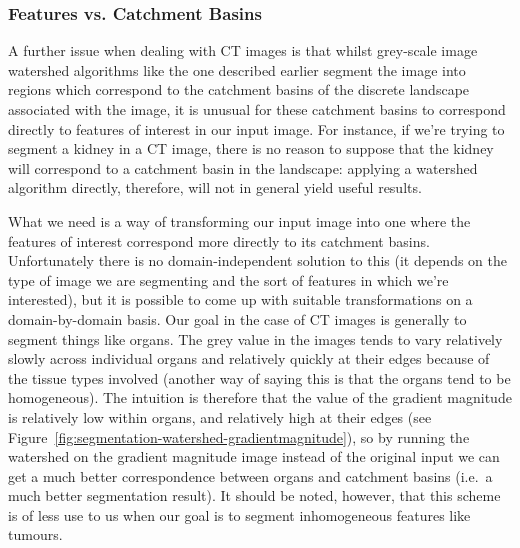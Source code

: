\subsubsection{Features vs. Catchment Basins}

A further issue when dealing with CT images is that whilst grey-scale image watershed algorithms like the one described earlier segment the image into regions which correspond to the catchment basins of the discrete landscape associated with the image, it is unusual for these catchment basins to correspond directly to features of interest in our input image. For instance, if we're trying to segment a kidney in a CT image, there is no reason to suppose that the kidney will correspond to a catchment basin in the landscape: applying a watershed algorithm directly, therefore, will not in general yield useful results.

What we need is a way of transforming our input image into one where the features of interest correspond more directly to its catchment basins. Unfortunately there is no domain-independent solution to this (it depends on the type of image we are segmenting and the sort of features in which we're interested), but it is possible to come up with suitable transformations on a domain-by-domain basis. Our goal in the case of CT images is generally to segment things like organs. The grey value in the images tends to vary relatively slowly across individual organs and relatively quickly at their edges because of the tissue types involved (another way of saying this is that the organs tend to be homogeneous). The intuition is therefore that the value of the gradient magnitude is relatively low within organs, and relatively high at their edges (see Figure~\ref{fig:segmentation-watershed-gradientmagnitude}), so by running the watershed on the gradient magnitude image instead of the original input we can get a much better correspondence between organs and catchment basins (i.e.~a much better segmentation result). It should be noted, however, that this scheme is of less use to us when our goal is to segment inhomogeneous features like tumours.

